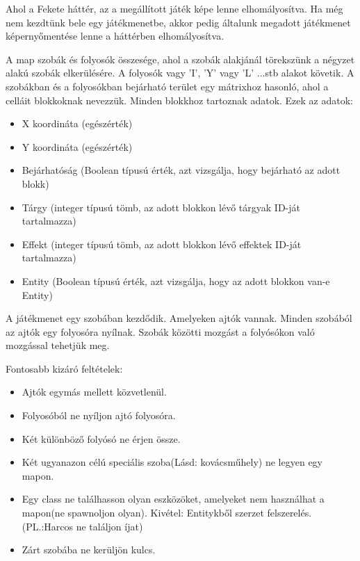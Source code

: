 Ahol a Fekete háttér, az a megállított játék képe lenne elhomályosítva.
Ha még nem kezdtünk bele egy játékmenetbe, akkor pedig általunk megadott játékmenet képernyőmentése lenne a háttérben elhomályosítva.



A map szobák és folyosók összesége, ahol a szobák alakjánál törekszünk a négyzet alakú szobák elkerülésére. A folyosók vagy 'I', 'Y' vagy 'L' ...stb alakot követik. A szobákban és a folyosókban bejárható terület egy mátrixhoz hasonló, ahol a celláit blokkoknak nevezzük.
Minden blokkhoz tartoznak adatok.
Ezek az adatok:
\begin{itemize}
    \item X koordináta (egészérték)
    \item Y koordináta (egészérték)
    \item Bejárhatóság (Boolean típusú érték, azt vizsgálja, hogy bejárható az adott blokk)
    \item Tárgy (integer típusú tömb, az adott blokkon lévő tárgyak ID-ját tartalmazza)
    \item Effekt (integer típusú tömb, az adott blokkon lévő effektek ID-ját tartalmazza)
    \item Entity (Boolean típusú érték, azt vizsgálja, hogy az adott blokkon van-e Entity)
\end{itemize}


A játékmenet egy szobában kezdődik. Amelyeken ajtók vannak. Minden szobából az ajtók egy folyosóra nyílnak. Szobák közötti mozgást a folyósókon való mozgással tehetjük meg.


Fontosabb kizáró feltételek:
\begin{itemize}
    \item Ajtók egymás mellett közvetlenül.
    \item Folyosóból ne nyíljon ajtó folyosóra.
    \item Két különböző folyósó ne érjen össze.
    \item Két ugyanazon célú speciális szoba(Lásd: kovácsműhely) ne legyen egy mapon.
    \item Egy class ne találhasson olyan eszközöket, amelyeket nem használhat a mapon(ne spawnoljon olyan). Kivétel: Entitykből szerzet felszerelés. (PL.:Harcos ne találjon íjat)
    \item Zárt szobába ne kerüljön kulcs.
\end{itemize}

